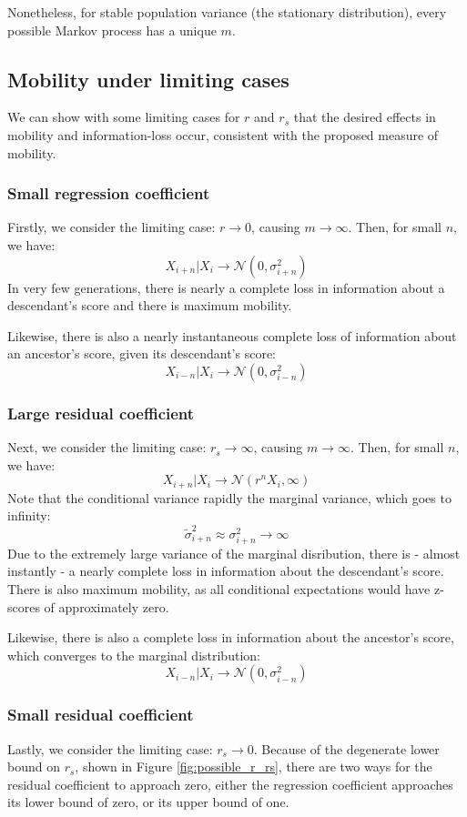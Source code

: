 \documentclass[a4paper,11pt]{article} %
\begin{document}
Nonetheless, for stable population variance (the stationary distribution), every possible Markov process has a unique $m$. 

\subsection{Mobility under limiting cases}

We can show with some limiting cases for $r$ and $r_s$ that the desired effects in mobility and information-loss occur, consistent with the proposed measure of mobility. 

\subsubsection*{Small regression coefficient}
Firstly, we consider the limiting case: $r \rightarrow 0$, causing $m \rightarrow \infty$. Then, for small $n$, we have:
$$X_{i+n}|X_i \rightarrow \mathcal{N}(0, \sigma_{i+n}^2)$$
In very few generations, there is nearly a complete loss in information about a descendant's score and there is maximum mobility. 

Likewise, there is also a nearly instantaneous complete loss of information about an ancestor's score, given its descendant's score:
$$X_{i-n}|X_i \rightarrow \mathcal{N}(0, \sigma_{i-n}^2)$$


\subsubsection*{Large residual coefficient}
Next, we consider the limiting case: $r_s \rightarrow \infty$, causing $m \rightarrow \infty$. Then, for small $n$, we have:
$$X_{i+n}|X_i \rightarrow \mathcal{N}(r^nX_i, \infty)$$
Note that the conditional variance rapidly the marginal variance, which goes to infinity:
$$ \tilde{\sigma}_{i+n}^2 \approx \sigma_{i+n}^2 \rightarrow \infty$$
Due to the extremely large variance of the marginal disribution, there is - almost instantly - a nearly complete loss in information about the descendant's score. There is also maximum mobility, as all conditional expectations would have z-scores of approximately zero. 

Likewise, there is also a complete loss in information about the ancestor's score, which converges to the marginal distribution:
$$X_{i-n}|X_i \rightarrow \mathcal{N}(0, \sigma_{i-n}^2)$$


\subsubsection*{Small residual coefficient}
Lastly, we consider the limiting case: $r_s \rightarrow 0$. Because of the degenerate lower bound on $r_s$, shown in Figure \ref{fig:possible_r_rs}, there are two ways for the residual coefficient to approach zero, either the regression coefficient approaches its lower bound of zero, or its upper bound of one.
\end{document}
